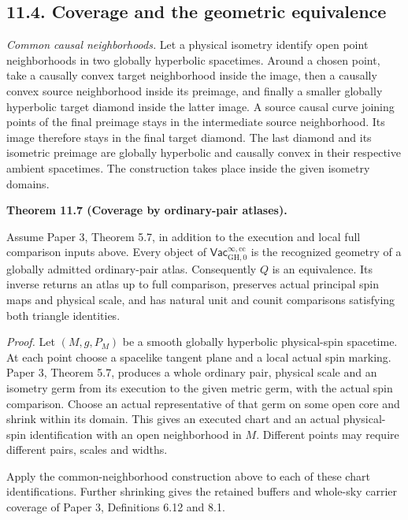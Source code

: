 \documentclass[
  english,
  11pt,
  reqno]{amsart}
\makeatletter
\newcommand{\pandocstatementheading}[1]{%
  \par\addpenalty{\@beginparpenalty}%
  \addvspace{.5\baselineskip plus .2\baselineskip minus .2\baselineskip}%
  {\normalfont\bfseries #1\par}%
  \nobreak\@afterindenttrue\@afterheading
}
\makeatother
\begin{document}
\protect{}\label{sec:ordinary-atlas-coverage}

\subsection{11.4. Coverage and the geometric
equivalence}\label{coverage-and-the-geometric-equivalence}

\emph{Common causal neighborhoods.} Let a physical isometry identify
open point neighborhoods in two globally hyperbolic spacetimes. Around a
chosen point, take a causally convex target neighborhood inside the
image, then a causally convex source neighborhood inside its preimage,
and finally a smaller globally hyperbolic target diamond inside the
latter image. A source causal curve joining points of the final preimage
stays in the intermediate source neighborhood. Its image therefore stays
in the final target diamond. The last diamond and its isometric preimage
are globally hyperbolic and causally convex in their respective ambient
spacetimes. The construction takes place inside the given isometry
domains.

\pandocstatementheading{\protect{}\label{thm:ordinary-atlas-geometric-equivalence}Theorem 11.7 (Coverage by ordinary-pair atlases).}

Assume Paper 3, Theorem 5.7, in addition to the execution and local full
comparison inputs above. Every object of
\(\mathsf{Vac}^{\infty,\mathrm{cc}}_{\mathrm{GH},0}\) is the recognized
geometry of a globally admitted ordinary-pair atlas. Consequently \(Q\)
is an equivalence. Its inverse returns an atlas up to full comparison,
preserves actual principal spin maps and physical scale, and has natural
unit and counit comparisons satisfying both triangle identities.

\emph{Proof.} Let \((M,g,P_M)\) be a smooth globally hyperbolic
physical-spin spacetime. At each point choose a spacelike tangent plane
and a local actual spin marking. Paper 3, Theorem 5.7, produces a whole
ordinary pair, physical scale and an isometry germ from its execution to
the given metric germ, with the actual spin comparison. Choose an actual
representative of that germ on some open core and shrink within its
domain. This gives an executed chart and an actual physical-spin
identification with an open neighborhood in \(M\). Different points may
require different pairs, scales and widths.

Apply the common-neighborhood construction above to each of these chart
identifications. Further shrinking gives the retained buffers and
whole-sky carrier coverage of Paper 3, Definitions 6.12 and 8.1.
\end{document}
